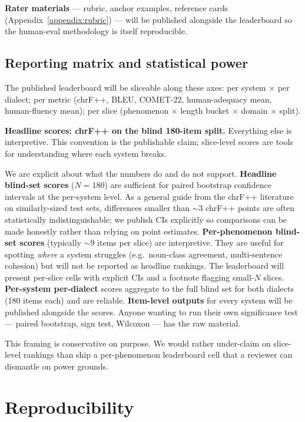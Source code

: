 \documentclass[11pt]{article}
\begin{document}
\textbf{Rater materials} --- rubric, anchor examples, reference
cards (Appendix~\ref{appendix:rubric}) --- will be published
alongside the leaderboard so the human-eval methodology is itself
reproducible.

\subsection{Reporting matrix and statistical power}
\label{sec:reporting}

The published leaderboard will be sliceable along these axes:
per system $\times$ per dialect; per metric (chrF++, BLEU,
COMET-22, human-adequacy mean, human-fluency mean); per slice
(phenomenon $\times$ length bucket $\times$ domain $\times$ split).

\textbf{Headline scores: chrF++ on the blind 180-item split.}
Everything else is interpretive. This convention is the publishable
claim; slice-level scores are tools for understanding where each
system breaks.

We are explicit about what the numbers do and do not support.
\textbf{Headline blind-set scores} ($N = 180$) are sufficient for
paired bootstrap confidence intervals at the per-system level. As a
general guide from the chrF++ literature on similarly-sized test
sets, differences smaller than $\sim 3$ chrF++ points are often
statistically indistinguishable; we publish CIs explicitly so
comparisons can be made honestly rather than relying on point
estimates. \textbf{Per-phenomenon blind-set scores} (typically
$\sim 9$ items per slice) are interpretive. They are useful for
spotting \emph{where} a system struggles (e.g.\ noun-class
agreement, multi-sentence cohesion) but will not be reported as
headline rankings. The leaderboard will present per-slice cells
with explicit CIs and a footnote flagging small-$N$ slices.
\textbf{Per-system per-dialect} scores aggregate to the full blind
set for both dialects (180 items each) and are reliable.
\textbf{Item-level outputs} for every system will be published
alongside the scores. Anyone wanting to run their own significance
test --- paired bootstrap, sign test, Wilcoxon --- has the raw
material.

This framing is conservative on purpose. We would rather under-claim
on slice-level rankings than ship a per-phenomenon leaderboard cell
that a reviewer can dismantle on power grounds.

\section{Reproducibility}
\label{sec:repro}
\end{document}
